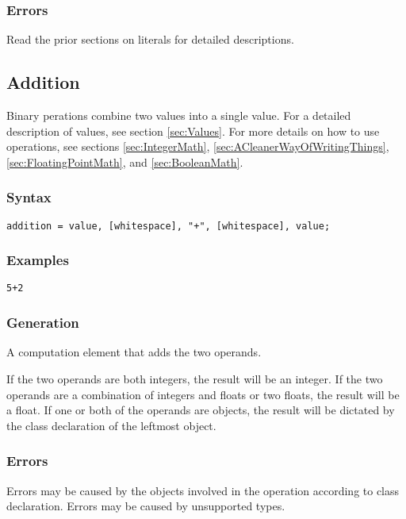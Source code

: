 \documentclass[10pt,a4paper]{article}
\begin{document}
\subsubsection{Errors}
Read the prior sections on literals for detailed descriptions.

\newpage




\subsection{Addition}
Binary perations combine two values into a single value. For a detailed description of values, see section \ref{sec:Values}. For more details on how to use operations, see sections \ref{sec:IntegerMath}, \ref{sec:ACleanerWayOfWritingThings}, \ref{sec:FloatingPointMath}, and \ref{sec:BooleanMath}.

\subsubsection{Syntax}
\begin{verbatim}
addition = value, [whitespace], "+", [whitespace], value;
\end{verbatim}

\subsubsection{Examples}
\begin{verbatim}
5+2
\end{verbatim}

\subsubsection{Generation}
A computation element that adds the two operands.

If the two operands are both integers, the result will be an integer. If the two operands are a combination of integers and floats or two floats, the result will be a float. If one or both of the operands are objects, the result will be dictated by the class declaration of the leftmost object.

\subsubsection{Errors}
Errors may be caused by the objects involved in the operation according to class declaration. Errors may be caused by unsupported types.
\end{document}
